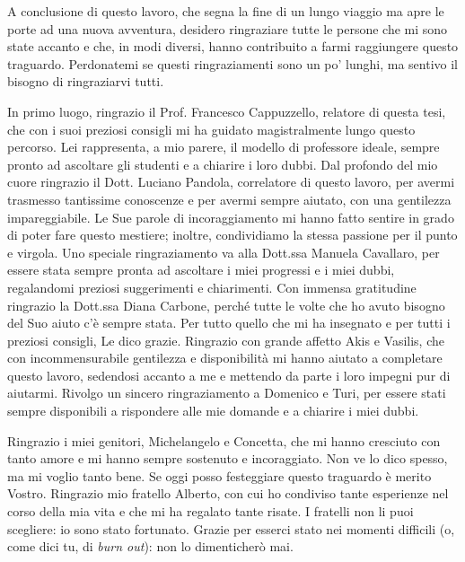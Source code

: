 

A conclusione di questo lavoro, che segna la fine di un lungo viaggio ma apre le porte ad una nuova avventura, desidero ringraziare tutte le persone che mi sono state accanto e che, in modi diversi, hanno contribuito a farmi raggiungere questo traguardo.
Perdonatemi se questi ringraziamenti sono un po' lunghi, ma sentivo il bisogno di ringraziarvi tutti.



In primo luogo, ringrazio il Prof. Francesco Cappuzzello, relatore di questa tesi, che con i suoi preziosi consigli mi ha guidato magistralmente lungo questo percorso.
Lei rappresenta, a mio parere, il modello di professore ideale, sempre pronto ad ascoltare gli studenti e a chiarire i loro dubbi.
Dal profondo del mio cuore ringrazio il Dott. Luciano Pandola, correlatore di questo lavoro, per avermi trasmesso tantissime conoscenze e per avermi sempre aiutato, con una gentilezza impareggiabile.
Le Sue parole di incoraggiamento mi hanno fatto sentire in grado di poter fare questo mestiere; inoltre, condividiamo la stessa passione per il punto e virgola.
Uno speciale ringraziamento va alla Dott.ssa Manuela Cavallaro, per essere stata sempre pronta ad ascoltare i miei progressi e i miei dubbi, regalandomi preziosi suggerimenti e chiarimenti.
Con immensa gratitudine ringrazio la Dott.ssa Diana Carbone, perché tutte le volte che ho avuto bisogno del Suo aiuto c'è sempre stata.
Per tutto quello che mi ha insegnato e per tutti i preziosi consigli, Le dico grazie.
Ringrazio con grande affetto Akis e Vasilis, che con incommensurabile gentilezza e disponibilità mi hanno aiutato a completare questo lavoro, sedendosi accanto a me e mettendo da parte i loro impegni pur di aiutarmi.
Rivolgo un sincero ringraziamento a Domenico e Turi, per essere stati sempre disponibili a rispondere alle mie domande e a chiarire i miei dubbi.

Ringrazio i miei genitori, Michelangelo e Concetta, che mi hanno cresciuto con tanto amore e mi hanno sempre sostenuto e incoraggiato.
Non ve lo dico spesso, ma mi voglio tanto bene.
Se oggi posso festeggiare questo traguardo è merito Vostro.
Ringrazio mio fratello Alberto, con cui ho condiviso tante esperienze nel corso della mia vita e che mi ha regalato tante risate.
I fratelli non li puoi scegliere: io sono stato fortunato.
Grazie per esserci stato nei momenti difficili (o, come dici tu, di \emph{burn out}): non lo dimenticherò mai.

